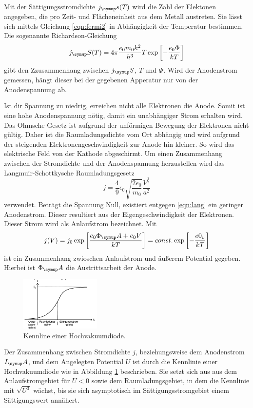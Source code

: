 Mit der Sättigungsstromdichte $j_\su{s(T)}$ wird die Zahl der Elektonen angegeben,
die pro Zeit- und Flächeneinheit aus dem Metall austreten. Sie lässt sich mittels
Gleichung \eqref{eqn:fermi2} in Abhängigkeit der Temperatur bestimmen. Die sogenannte
Richardson-Gleichung
\begin{equation*}
  j_\su{S}(T) = 4\pi\frac{e_0 m_0 k^2}{h^3}T\exp\left[-\frac{e_0\Phi}{kT}\right]
  \label{eqn:richard}
\end{equation*}
gibt den Zzusammenhang zwischen $j_\su{S}$, $T$ und $\Phi$. Wird der Anodenstrom
gemessen, hängt dieser bei der gegebenen Apperatur nur von der Anodenspannung ab.

Ist dir Spannung zu niedrig, erreichen nicht alle Elektronen die Anode. Somit ist
eine hohe Anodenspannung nötig, damit ein unabhängiger Strom erhalten wird.
Das Ohmsche Gesetz ist aufgrund der unförmigen Bewegung der Elektronen nicht
gültig. Daher ist die Raumladungsdichte vom Ort abhängig und wird aufgrund der
steigenden Elektronengeschwindigkeit zur Anode hin kleiner. So wird das elektrische
Feld von der Kathode abgeschirmt.
Um einen Zusammenhang zwischen der Stromdichte und der Anodenspannung herzustellen
wird das Langmuir-Schottkysche Raumladungsgesetz
\begin{equation}
  j = \frac{4}{9}\epsilon_0\sqrt{\frac{2e_0}{m_0}}\frac{V^{\frac{3}{2}}}{a^2}
  \label{eqn:lang}
\end{equation}
verwendet.
Beträgt die Spannung Null, existiert entgegen \eqref{eqn:lang} ein geringer
Anodenstrom. Dieser resultiert aus der Eigengeschwindigkeit der Elektronen. Dieser
Strom wird als Anlaufstrom bezeichnet.
Mit
\begin{equation}
  j(V) = j_0\exp\left[\frac{e_0\Phi_\su{A}+e_0 V}{kT}\right] = const. \exp\left[-\frac
  {e0_v}{kT}\right]
\end{equation}
ist ein Zusammenhang zwioschen Anlaufstrom und äußerem Potential gegeben. Hierbei
ist $\Phi_\su{A}$ die Austrittsarbeit der Anode.

\begin{figure}
  \includegraphics[width=4cm]{bilder/kennlinie.jpg}
  \caption{Kennline einer Hochvakuumdiode.\cite{504}}
  \label{kenn}
\end{figure}
Der Zusammenhang zwischen Stromdichte $j$, beziehungsweise dem Anodenstrom $I_\su{A}$,
und dem Angelegten Potential $U$ ist durch die Kennlinie einer Hochvakuumdiode
wie in Abbildung \ref{kenn} beschrieben.
Sie setzt sich aus aus dem Anlaufstromgebiet für $U<0$ sowie dem Raumladungsgebiet,
in dem die Kennlinie mit $\sqrt{U^3}$ wächst, bis sie sich asymptotisch im
Sättigungsstromgebiet einem Sättigungswert annähert.
